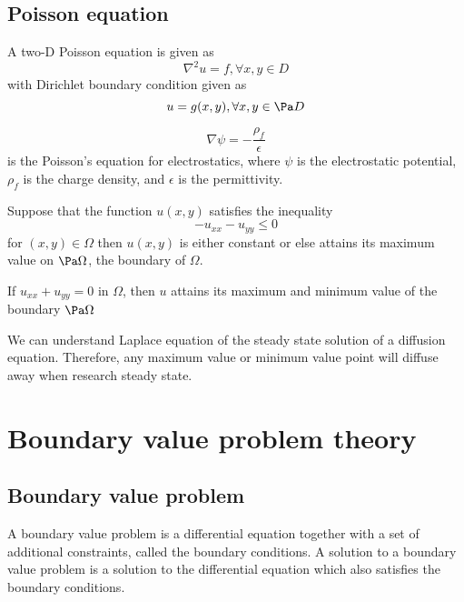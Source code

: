 \begin{refsection}
\subsection{Poisson equation}
\begin{definition}
A two-D Poisson equation is given as
$$\nabla^2 u = f,\forall x,y \in D$$
with Dirichlet boundary condition given as
$$u = g(x,y), \forall x,y\in \Pa D$$
\end{definition}

\begin{example}
	$$\nabla \psi = -\frac{\rho_f}{\epsilon}$$
is the Poisson's equation for electrostatics, where $\psi$ is the electrostatic potential, $\rho_f$ is the charge density, and $\epsilon$ is the permittivity. 
\end{example}



\begin{theorem}\cite[122]{griffiths2015essential}
Suppose that the function $u(x,y)$ satisfies the inequality
$$-u_{xx} - u_{yy} \leq 0$$
for $(x,y)\in \Omega$ then $u(x,y)$ is either constant or else attains its maximum value on $\Pa \Omega$, the boundary of $\Omega$.
\end{theorem}


\begin{corollary}\cite[122]{griffiths2015essential}
If $u_{xx} + u_{yy} = 0$ in $\Omega$, then $u$ attains its maximum and minimum value of the boundary $\Pa \Omega$
\end{corollary}


\begin{remark}[intuition]
We can understand Laplace equation of the steady state solution of a diffusion equation. Therefore, any maximum value or minimum value point will diffuse away when research steady state.
\end{remark}

\section{Boundary value problem theory}
\subsection{Boundary value problem}

\begin{definition}
A boundary value problem is a differential equation together with a set of additional constraints, called the boundary conditions. A solution to a boundary value problem is a solution to the differential equation which also satisfies the boundary conditions.
\end{definition}


\end{refsection}

